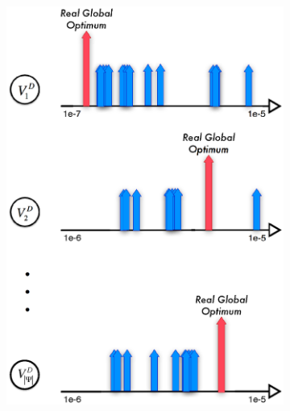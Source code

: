   \begin{figure}[t]
      \centering
      \begin{subfigure}[t]{0.4\textwidth}
        \includegraphics[width=\textwidth]{Fig/popSampling.eps}
      \end{subfigure}
      \begin{subfigure}[t]{0.4\textwidth}

\end{subfigure}
\end{figure}
